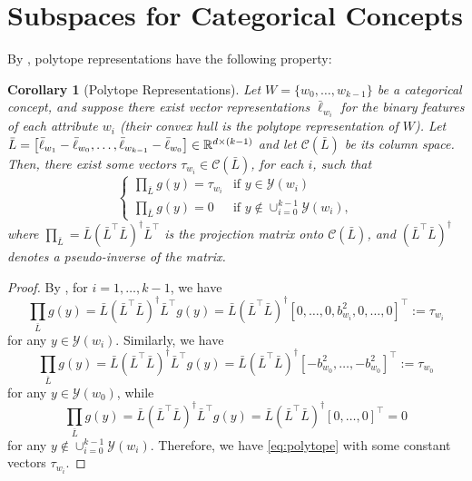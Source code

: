 \documentclass{article}
\newtheorem{corollary}[theorem]{Corollary}
\newcommand{\yquad}{\mathcal{Y}}
\begin{document}
\section{Subspaces for Categorical Concepts}\label{sec:polytope}

By , polytope representations have the following property:
\begin{corollary}[Polytope Representations]\label{cor:polytope}
  Let $W = \{w_0, \dots, w_{k-1}\}$ be a categorical concept, and suppose there exist vector representations $\bar\ell_{w_i}$ for the binary features of each attribute $w_i$ (their convex hull is the polytope representation of $W$). 
  Let $\bar{L} = \left[\bar\ell_{w_1} - \bar\ell_{w_0}, \dots, \bar\ell_{w_{k-1}} - \bar\ell_{w_0}\right]\in \mathbb{R}^{d\times (k-1)}$ and let $\mathcal{C}(\bar{L})$ be its column space.
  Then, there exist some vectors $\tau_{w_i} \in \mathcal{C}(\bar{L})$, for each $i$, such that
  \begin{equation}\label{eq:polytope}
    \begin{cases}
      \prod_{\bar{L}}  g(y) = \tau_{w_i} & \text{if } y\in \yquad(w_i)\\
      \prod_{\bar{L}}  g(y) = 0 & \text{if } y \not\in \cup_{i=0}^{k-1}\yquad(w_i),
    \end{cases}
  \end{equation}
  where $\prod_{\bar{L}} = \bar{L}(\bar{L}^\top \bar{L})^{\dagger}\bar{L}^\top$ is the projection matrix onto $\mathcal{C}(\bar{L})$, and $(\bar{L}^\top \bar{L})^{\dagger}$ denotes a pseudo-inverse of the matrix.
\end{corollary}
\begin{proof}
  By , for $i=1, \dots, k-1$, we have
  \begin{equation}
    \prod_{\bar{L}}g(y) = \bar{L}(\bar{L}^\top\bar{L})^{\dagger} \bar{L}^\top g(y) = \bar{L}(\bar{L}^\top\bar{L})^{\dagger}   \left[0, \dots, 0, b_{w_i}^2, 0, \dots, 0\right]^\top := \tau_{w_i}
  \end{equation}
  for any $y\in \yquad(w_i)$. Similarly, we have
  \begin{equation}
    \prod_{\bar{L}}g(y)  = \bar{L}(\bar{L}^\top\bar{L})^{\dagger} \bar{L}^\top g(y)  = \bar{L}(\bar{L}^\top\bar{L})^{\dagger} \left[ - b_{w_0}^2, \dots, - b_{w_0}^2\right]^\top := \tau_{w_0}
  \end{equation}
  for any $y \in \yquad(w_0)$, while
  \begin{equation}
    \prod_{\bar{L}}g(y)  = \bar{L}(\bar{L}^\top\bar{L})^{\dagger} \bar{L}^\top g(y)  = \bar{L}(\bar{L}^\top\bar{L})^{\dagger} \left[0, \dots, 0\right]^\top =0
  \end{equation}
  for any $y\not\in \cup_{i=0}^{k-1}\yquad(w_i)$.
  Therefore, we have \cref{eq:polytope} with some constant vectors $\tau_{w_i}$.
\end{proof}
\end{document}
